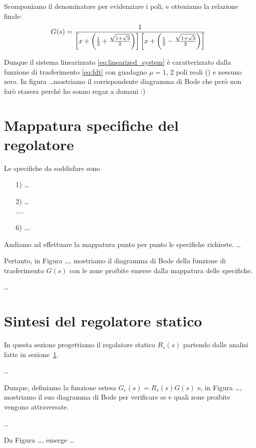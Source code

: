 \documentclass[a4paper, 11pt]{article}
\begin{document}
Scomponiamo il denominatore per evidenziare i poli, e otteniamo la relazione finale:
\begin{align}\label{eq:fdt}
	G(s) = \frac{1}{\left[ x + \left( \frac{1}{2} + \frac{\sqrt{1+\sqrt{3}}}{2} \right) \right]\left[ x + \left( \frac{1}{2}-\frac{\sqrt{1+\sqrt{3}}}{2} \right) \right]}
\end{align}

Dunque il sistema linearizzato \eqref{eq:linearized_system} è caratterizzato dalla funzione di trasferimento \eqref{eq:fdt} con guadagno $\mu=1$, 2 poli reali () e nessuno zero. In figura \dots mostriamo il corrispondente diagramma di Bode che però non farò stasera perché ho sonno regaz a domani :)


\section{Mappatura specifiche del regolatore}
\label{sec:specifications}

Le specifiche da soddisfare sono
\begin{itemize}
	\item[1)] \dots\\
	\item[2)] \dots\\
	....\\
	\item[6)] \dots.
\end{itemize}
%
Andiamo ad effettuare la mappatura punto per punto le specifiche richieste. \dots  

Pertanto, in Figura \dots, mostriamo il diagramma di Bode della funzione di trasferimento $G(s)$ con le zone proibite emerse dalla mappatura delle specifiche.

\dots

\section{Sintesi del regolatore statico}
\label{sec:static_regulator}

In questa sezione progettiamo il regolatore statico $R_s(s)$ partendo dalle analisi fatte in sezione~\ref{sec:specifications}.

\dots

Dunque, definiamo la funzione estesa $G_e(s) = R_s(s)G(s)$ e, in Figura \dots, mostriamo il suo diagramma di Bode per verificare se e quali zone proibite vengono attraversate.

\dots

Da Figura \dots, emerge \dots
\end{document}
